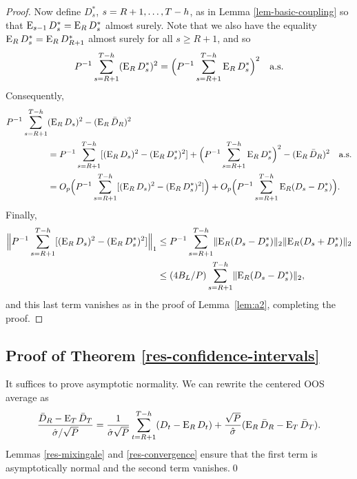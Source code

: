 \documentclass[11pt]{article}
\begin{document}
\begin{proof}
Now define $D_s^*$, $s = R+1,\dots,T-h$, as in Lemma
\ref{lem-basic-coupling} so that $\operatorname{E}_{s-1} D_s^* = \operatorname{E}_R D_s^*$ almost
surely.  Note that we also have the equality $\operatorname{E}_R D_s^* = \operatorname{E}_R
D_{R+1}^*$ almost surely for all $s\geq R+1$, and so
\[
P^{-1} \sum_{s=R+1}^{T-h} (\operatorname{E}_R D_s^*)^2 = \Big(P^{-1} \sum_{s=R+1}^{T-h} \operatorname{E}_R
D_s^*\Big)^2 \quad \text{a.s.}
\]
Consequently,
\begin{align*}
P^{-1} \sum_{s=R+1}^{T-h}& (\operatorname{E}_R D_s)^2 - (\operatorname{E}_R\bar{D}_{R})^2 \\
&= P^{-1} \sum_{s=R+1}^{T-h} [(\operatorname{E}_R D_s)^2 - (\operatorname{E}_R D_s^*)^2]
 + \Big(P^{-1} \sum_{s=R+1}^{T-h} \operatorname{E}_R D_s^*\Big)^2 - (\operatorname{E}_R\bar{D}_{R})^2 \quad \text{a.s}.\\
&= O_p\Big(P^{-1} \sum_{s=R+1}^{T-h} [(\operatorname{E}_R D_s)^2 - (\operatorname{E}_R D_s^*)^2]\Big)
 + O_p\Big(P^{-1} \sum_{s=R+1}^{T-h} \operatorname{E}_R (D_s - D_s^*)\Big).
\end{align*}
Finally,
\begin{align*}
\Big\lVert P^{-1} \sum_{s=R+1}^{T-h} [(\operatorname{E}_RD_s)^2 - (\operatorname{E}_R D_s^*)^2] \Big\rVert_1
&\leq P^{-1} \sum_{s=R+1}^{T-h} \lVert \operatorname{E}_R (D_s - D_s^*) \rVert_2 \lVert
\operatorname{E}_R (D_s + D_s^*) \rVert_2
\\ &\leq (4 B_L/P) \sum_{s=R+1}^{T-h} \lVert \operatorname{E}_R (D_s - D_s^*) \rVert_2,
\end{align*}
and this last term vanishes as in the proof of Lemma~\ref{lem:a2},
completing the proof.
\end{proof}

\subsection*{Proof of Theorem \ref{res-confidence-intervals}}

It suffices to prove asymptotic normality.  We can rewrite the
centered OOS average as
\[
\frac{\bar{D}_{R} - \operatorname{E}_T \bar{D}_T}{\hat{\sigma} / \sqrt{P}} =
\frac{1}{\hat{\sigma} \sqrt{P}}\sum_{t=R+1}^{T-h} (D_t - \operatorname{E}_R D_t) +
\frac{\sqrt{P}}{\hat{\sigma}} (\operatorname{E}_R\bar{D}_{R} - \operatorname{E}_T\bar{D}_{T}).
\]
Lemmas \ref{res-mixingale} and
\ref{res-convergence} ensure that the first term is asymptotically
normal and the second term vanishes.\qed
\end{document}
